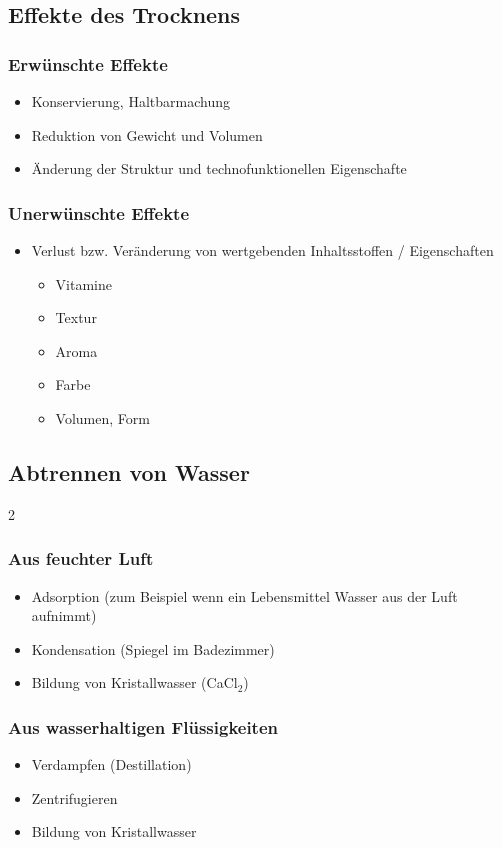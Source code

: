 \documentclass[a4paper,10pt,twoside]{article}
\begin{document}
\subsection{Effekte des Trocknens}
\subsubsection{Erwünschte Effekte}
\begin{itemize}
\item Konservierung, Haltbarmachung
\item Reduktion von Gewicht und Volumen
\item Änderung der Struktur und technofunktionellen Eigenschafte
\end{itemize}

\subsubsection{Unerwünschte Effekte}
\begin{itemize}
\item Verlust bzw. Veränderung von wertgebenden Inhaltsstoffen / Eigenschaften
\begin{itemize}
\item Vitamine
\item Textur
\item Aroma
\item Farbe
\item Volumen, Form
\end{itemize}
\end{itemize}

\subsection{Abtrennen von Wasser}

\begin{multicols}{2}

\subsubsection{Aus feuchter Luft}
\begin{itemize}
\item Adsorption (zum Beispiel wenn ein Lebensmittel Wasser aus der Luft aufnimmt)
\item Kondensation (Spiegel im Badezimmer)
\item Bildung von Kristallwasser (CaCl$_2$)
\end{itemize}

\columnbreak
\subsubsection{Aus wasserhaltigen Flüssigkeiten}
\begin{itemize}
\item Verdampfen (Destillation)
\item Zentrifugieren
\item Bildung von Kristallwasser
\end{itemize}
\end{multicols}
\end{document}
